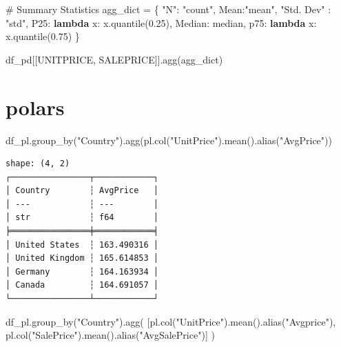 \documentclass[
  letterpaper,
  DIV=11,
  numbers=noendperiod]{scrreprt}
\newenvironment{Shaded}{\begin{snugshade}}{\end{snugshade}}
\newcommand{\CommentTok}[1]{\textcolor[rgb]{0.37,0.37,0.37}{#1}}
\newcommand{\FloatTok}[1]{\textcolor[rgb]{0.68,0.00,0.00}{#1}}
\newcommand{\KeywordTok}[1]{\textcolor[rgb]{0.00,0.23,0.31}{\textbf{#1}}}
\newcommand{\NormalTok}[1]{\textcolor[rgb]{0.00,0.23,0.31}{#1}}
\newcommand{\OperatorTok}[1]{\textcolor[rgb]{0.37,0.37,0.37}{#1}}
\newcommand{\StringTok}[1]{\textcolor[rgb]{0.13,0.47,0.30}{#1}}
\begin{document}
\begin{Shaded}
\begin{Highlighting}[]
\CommentTok{\# Summary Statistics }
\NormalTok{agg\_dict }\OperatorTok{=}\NormalTok{ \{}
    \StringTok{"N"}\NormalTok{: }\StringTok{"count"}\NormalTok{,}
    \StringTok{\textquotesingle{}Mean\textquotesingle{}}\NormalTok{:}\StringTok{"mean"}\NormalTok{,}
    \StringTok{"Std. Dev"}\NormalTok{ : }\StringTok{"std"}\NormalTok{,}
    \StringTok{\textquotesingle{}P25\textquotesingle{}}\NormalTok{: }\KeywordTok{lambda}\NormalTok{ x: x.quantile(}\FloatTok{0.25}\NormalTok{),}
    \StringTok{\textquotesingle{}Median\textquotesingle{}}\NormalTok{: }\StringTok{\textquotesingle{}median\textquotesingle{}}\NormalTok{,}
    \StringTok{\textquotesingle{}p75\textquotesingle{}}\NormalTok{: }\KeywordTok{lambda}\NormalTok{ x: x.quantile(}\FloatTok{0.75}\NormalTok{)}
\NormalTok{\}}

\NormalTok{df\_pd[[}\StringTok{\textquotesingle{}UNITPRICE\textquotesingle{}}\NormalTok{, }\StringTok{\textquotesingle{}SALEPRICE\textquotesingle{}}\NormalTok{]].agg(agg\_dict)}
\end{Highlighting}
\end{Shaded}

\section{polars}

\begin{Shaded}
\begin{Highlighting}[]
\NormalTok{df\_pl.group\_by(}\StringTok{"Country"}\NormalTok{).agg(pl.col(}\StringTok{"UnitPrice"}\NormalTok{).mean().alias(}\StringTok{"AvgPrice"}\NormalTok{))}
\end{Highlighting}
\end{Shaded}

\begin{verbatim}
shape: (4, 2)
┌────────────────┬────────────┐
│ Country        ┆ AvgPrice   │
│ ---            ┆ ---        │
│ str            ┆ f64        │
╞════════════════╪════════════╡
│ United States  ┆ 163.490316 │
│ United Kingdom ┆ 165.614853 │
│ Germany        ┆ 164.163934 │
│ Canada         ┆ 164.691057 │
└────────────────┴────────────┘
\end{verbatim}

\begin{Shaded}
\begin{Highlighting}[]
\NormalTok{df\_pl.group\_by(}\StringTok{"Country"}\NormalTok{).agg(}
\NormalTok{    [pl.col(}\StringTok{"UnitPrice"}\NormalTok{).mean().alias(}\StringTok{"Avgprice"}\NormalTok{),}
\NormalTok{     pl.col(}\StringTok{"SalePrice"}\NormalTok{).mean().alias(}\StringTok{"AvgSalePrice"}\NormalTok{)]}
\NormalTok{)}
\end{Highlighting}
\end{Shaded}
\end{document}
